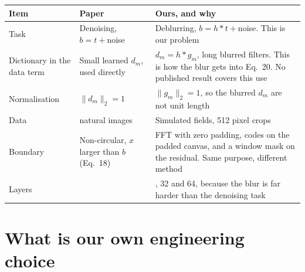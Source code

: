 \begin{center}
\renewcommand{\arraystretch}{1.3}
\begin{tabularx}{\textwidth}{>{\raggedright\arraybackslash}p{3.1cm}>{\raggedright\arraybackslash}X>{\raggedright\arraybackslash}X}
\toprule
Item & Paper & Ours, and why \\
\midrule
Task & Denoising, $b=t+$noise & Deblurring, $b=h*t+$noise. This is our problem \\
Dictionary in the data term & Small learned $d_m$, used directly & $d_m=h*g_m$, long blurred filters. This is how the blur gets into Eq.~20. No published result covers this use \\
Normalisation & $\lVert d_m\rVert_2=1$ & $\lVert g_m\rVert_2=1$, so the blurred $d_m$ are not unit length \\
Data & 400 natural images & Simulated fields, 512 pixel crops \\
Boundary & Non-circular, $x$ larger than $b$ (Eq.~18) & FFT with zero padding, codes on the padded canvas, and a window mask on the residual. Same purpose, different method \\
Layers & 5 & 16, 32 and 64, because the blur is far harder than the denoising task \\
\bottomrule
\end{tabularx}
\end{center}

\section{What is our own engineering choice}

